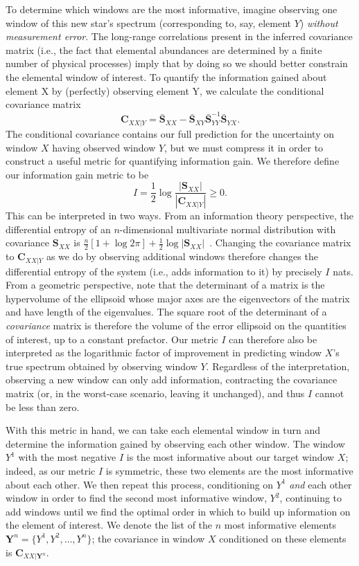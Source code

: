 \documentclass[a4paper,fleqn,usenatbib]{mnras}
\newcommand{\speccov}{{\bm S}}
\newcommand{\condcov}{{\bm C}}
\begin{document}
To determine which windows are the most informative, imagine observing one window of this new star's spectrum (corresponding to, say, element $Y$) {\it without measurement error}. The long-range correlations present in the inferred covariance matrix (i.e., the fact that elemental abundances are determined by a finite number of physical processes) imply that by doing so we should better constrain the elemental window of interest. To quantify the information gained about element X by (perfectly) observing element Y, we calculate the conditional covariance matrix
\begin{equation}
\condcov_{XX|Y} = \bar{\speccov}_{XX} - \bar{\speccov}_{XY} \bar{\speccov}_{YY}^{-1} \bar{\speccov}_{YX}.
\end{equation}
The conditional covariance contains our full prediction for the uncertainty on window $X$ having observed window $Y$, but we must compress it in order to construct a useful metric for quantifying information gain. We therefore define our information gain metric to be
\begin{equation}
I = \frac{1}{2} \log \frac{ \left| \speccov_{XX} \right| }{ \left| \condcov_{XX|Y} \right| } \ge 0.
\end{equation}
This can be interpreted in two ways. From an information theory perspective, the differential entropy of an $n$-dimensional multivariate normal distribution with covariance $\speccov_{XX}$ is $\frac{n}{2} \left[1 + \log 2\pi \right] + \frac{1}{2} \log |\speccov_{XX}|$~\citep[see, e.g.,][Chapter 9]{Cover_Thomas:2006}. Changing the covariance matrix to $\condcov_{XX|Y}$ as we do by observing additional windows therefore changes the differential entropy of the system (i.e., adds information to it) by precisely $I$ nats. From a geometric perspective, note that the determinant of a matrix is the hypervolume of the ellipsoid whose major axes are the eigenvectors of the matrix and have length of the eigenvalues. The square root of the determinant of a {\it covariance} matrix is therefore the volume of the error ellipsoid on the quantities of interest, up to a constant prefactor. Our metric $I$ can therefore also be interpreted as the logarithmic factor of improvement in predicting window $X$'s true spectrum obtained by observing window $Y$. Regardless of the interpretation, observing a new window can only add information, contracting the covariance matrix (or, in the worst-case scenario, leaving it unchanged), and thus $I$ cannot be less than zero.

With this metric in hand, we can take each elemental window in turn and determine the information gained by observing each other window. The window $Y^1$ with the most negative $I$ is the most informative about our target window $X$; indeed, as our metric $I$ is symmetric, these two elements are the most informative about each other. We then repeat this process, conditioning on $Y^1$ {\it and} each other window in order to find the second most informative window, $Y^2$, continuing to add windows until we find the optimal order in which to build up information on the element of interest. We denote the list of the $n$ most informative elements $\bm{Y}^n = \{ Y^1, Y^2, \ldots, Y^n \}$; the covariance in window $X$ conditioned on these elements is $\condcov_{XX|\bm{Y}^n}$.
\end{document}
